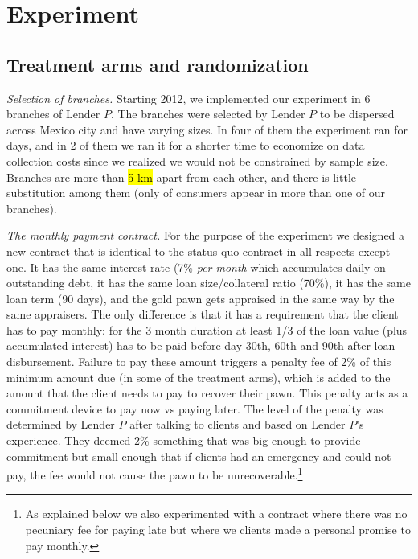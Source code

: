 \documentclass[11pt]{article}
\begin{document}
\section{Experiment} \label{Experiment}

\subsection{Treatment arms and randomization}

\noindent \textit{Selection of branches.} Starting  2012, we implemented our experiment in 6 branches of Lender $P$. The branches were selected by Lender $P$ to be dispersed across Mexico city and have varying sizes. In four of them the experiment ran for  days, and in 2 of them we ran it for a shorter time to economize on data collection costs since we realized we would not be constrained by sample size. %
Branches are more than \hl{5 km} apart from each other, and there is little substitution among them (only  of consumers appear in more than one of our branches).

\vspace{.2in}
\noindent \textit{The monthly payment contract.} For the purpose of the experiment we designed a new contract that is identical to the status quo contract in all respects except one. It has the same interest rate (7\% \textit{per month} which accumulates daily on outstanding debt, it has the same loan size/collateral ratio (70\%), it has the same loan term (90 days), and the gold pawn gets appraised in the same way by the same appraisers. The only difference is that it has a requirement that the client has to pay monthly: for the 3 month duration at least 1/3 of the loan value (plus accumulated interest) has to be paid before day 30th, 60th and 90th after loan disbursement. Failure to pay these amount triggers a penalty fee of 2\% of this minimum amount due (in some of the treatment arms), which is added to the amount that the client needs to pay to recover their pawn. This penalty acts as a commitment device to pay now vs paying later. The level of the penalty was determined by Lender $P$ after talking to clients and based on Lender $P$'s experience. They deemed 2\% something that was big enough to provide commitment but small enough that if clients had an emergency and could not pay, the fee would not cause the pawn to be unrecoverable.\footnote{As explained below we also experimented with a contract where there was no pecuniary fee for paying late but where we clients made a personal promise to pay monthly.} 
\end{document}

